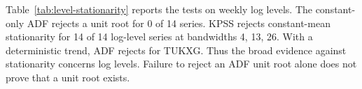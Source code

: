 Table~\ref{tab:level-stationarity} reports the tests on weekly log levels. The constant-only ADF rejects a unit root for 0 of 14 series. KPSS rejects constant-mean stationarity for 14 of 14 log-level series at bandwidths 4, 13, 26. With a deterministic trend, ADF rejects for TUKXG. Thus the broad evidence against stationarity concerns log levels. Failure to reject an ADF unit root alone does not prove that a unit root exists.
